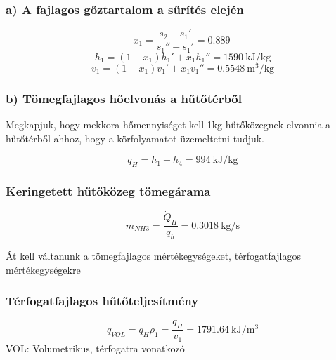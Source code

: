 \noindent\hrulefill

\subsubsection*{a) A fajlagos gőztartalom a sűrítés elején}

\begin{equation}
   x_1
   = 
   \dfrac{s_2 - s_1'}{s_1'' - s_1'} 
   = 
   \SI{0,889}{}
\end{equation}
\begin{equation}
   h_1 = \left(1 - x_1\right) h_1' + x_1 h_1'' 
   = 
   \SI{1590}{\kilo\joule\per\kilogram}
\end{equation}
\begin{equation}
   v_1 = \left(1 - x_1\right) v_1' + x_1 v_1'' 
   = 
   \SI{0,5548}{\meter\cubed\per\kilogram}
\end{equation}
 
\subsubsection*{b) Tömegfajlagos hőelvonás a hűtőtérből}

\noindent Megkapjuk, hogy mekkora hőmennyiséget kell 1kg hűtőközegnek elvonnia a hűtőtérből ahhoz, hogy a körfolyamatot üzemeltetni tudjuk.
 
\begin{equation}
  q_H = h_1-h_4 
  = 
  \SI{994}{\kilo\joule\per\kilogram}
\end{equation}
 
 \subsubsection*{Keringetett hűtőközeg tömegárama}
 
\begin{equation}
   {\dot{m}}_{NH3}= \dfrac{\dot{Q}_H}{q_h} = \SI{0,3018}{\kilogram\per\second}
\end{equation}

\noindent Át kell váltanunk a tömegfajlagos mértékegységeket, térfogatfajlagos mértékegységekre

\subsubsection*{Térfogatfajlagos hűtőteljesítmény}
  
\begin{equation}
    {q}_{VOL} = q_H \rho_1
    =
    \dfrac{q_H}{v_1}
    =\SI{1791,64}{\kilo\joule\per\meter\cubed}
\end{equation} 
\noindent VOL: Volumetrikus, térfogatra vonatkozó

